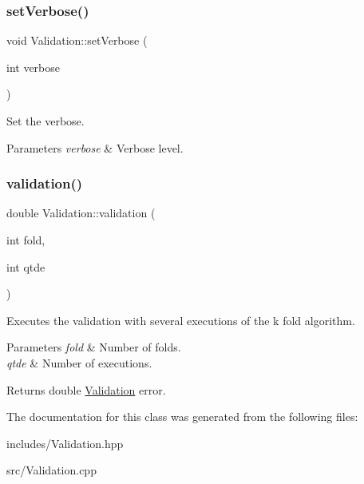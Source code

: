 \subsubsection{\texorpdfstring{set\+Verbose()}{setVerbose()}}
{\footnotesize\ttfamily void Validation\+::set\+Verbose (\begin{DoxyParamCaption}\item[{int}]{verbose }\end{DoxyParamCaption})\hspace{0.3cm}{\ttfamily [inline]}}



Set the verbose. 


\begin{DoxyParams}{Parameters}
{\em verbose} & Verbose level. \\
\hline
\end{DoxyParams}
\mbox{\label{class_validation_a8d4b505b7e85e1fc9c90515ad3454977}} 
\subsubsection{\texorpdfstring{validation()}{validation()}}
{\footnotesize\ttfamily double Validation\+::validation (\begin{DoxyParamCaption}\item[{int}]{fold,  }\item[{int}]{qtde }\end{DoxyParamCaption})}



Executes the validation with several executions of the k fold algorithm. 


\begin{DoxyParams}{Parameters}
{\em fold} & Number of folds. \\
\hline
{\em qtde} & Number of executions. \\
\hline
\end{DoxyParams}
\begin{DoxyReturn}{Returns}
double \hyperlink{class_validation}{Validation} error. 
\end{DoxyReturn}


The documentation for this class was generated from the following files\+:\begin{DoxyCompactItemize}
\item 
includes/Validation.\+hpp\item 
src/Validation.\+cpp\end{DoxyCompactItemize}
